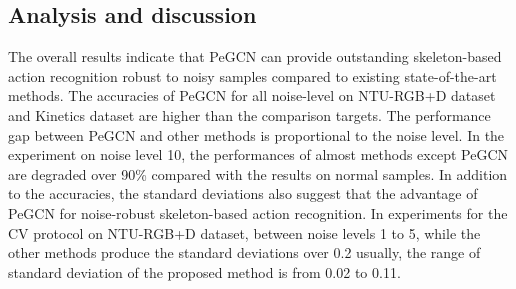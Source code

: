 \documentclass[runningheads]{llncs}
\begin{document}
\begin{table*}[t]
	\centering
	\caption{Performance comparison depending on the noise level using Kinetics-skeleton dataset.  The boldface figures denote the best performances among the listed methods.  indicates that the method were trained and tested by ourselves. The boldface figures denote the highest performance for each experiment.}
	\label{tab:kinetics}
	\vspace{-6ex}
\end{table*}


\subsection{Analysis and discussion}
The overall results indicate that PeGCN can provide outstanding skeleton-based action recognition robust to noisy samples compared to existing state-of-the-art methods. The accuracies of PeGCN for all noise-level on NTU-RGB+D dataset and Kinetics dataset are higher than the comparison targets. The performance gap between PeGCN and other methods is proportional to the noise level. In the experiment on noise level 10, the performances of almost methods except PeGCN are degraded over 90\% compared with the results on normal samples. In addition to the accuracies, the standard deviations also suggest that the advantage of PeGCN for noise-robust skeleton-based action recognition. In experiments for the CV protocol on NTU-RGB+D dataset, between noise levels 1 to 5, while the other methods produce the standard deviations over 0.2 usually, the range of standard deviation of the proposed method is from 0.02 to 0.11.
\end{document}
